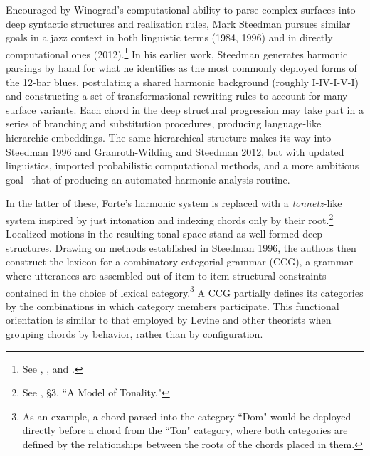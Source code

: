 Encouraged by Winograd's computational ability to parse complex surfaces into deep syntactic structures and realization rules, Mark Steedman pursues similar goals in a jazz context in both linguistic terms (1984, 1996) and in directly computational ones (2012).\footnote{See \cite{steedman1984}, \cite{steedman1996}, and \cite{granroth2012}.}  In his earlier work, Steedman generates harmonic parsings by hand for what he identifies as the most commonly deployed forms of the 12-bar blues, postulating a shared harmonic background (roughly I-IV-I-V-I) and constructing a set of transformational rewriting rules to account for many surface variants.  Each chord in the deep structural progression may take part in a series of branching and substitution procedures, producing language-like hierarchic embeddings. The same hierarchical structure makes its way into Steedman 1996 and Granroth-Wilding and Steedman 2012, but with updated linguistics, imported probabilistic computational methods, and a more ambitious goal-- that of producing an automated harmonic analysis routine.

In the latter of these, Forte's harmonic system is replaced with a \emph{tonnetz}-like system inspired by just intonation and indexing chords only by their root.\footnote{See \cite{granroth2012}, \S 3, ``A Model of Tonality."}  Localized motions in the resulting tonal space stand as well-formed deep structures.  Drawing on methods established in Steedman 1996, the authors then construct the lexicon for a combinatory categorial grammar (CCG), a grammar where utterances are assembled out of item-to-item structural constraints contained in the choice of lexical category.\footnote{As an example, a chord parsed into the category ``Dom" would be deployed directly before a chord from the ``Ton" category, where both categories are defined by the relationships between the roots of the chords placed in them.}  A CCG partially defines its categories by the combinations in which category members participate.  This functional orientation is similar to that employed by Levine and other theorists when grouping chords by behavior, rather than by configuration.

